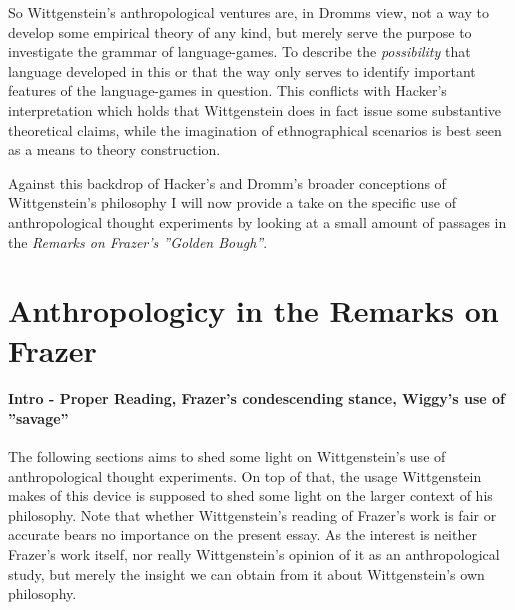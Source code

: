 \documentclass{article}
\begin{document}
So Wittgenstein's anthropological ventures are, in Dromms view, not a way to develop some empirical theory of any kind, but merely serve the purpose to investigate the grammar of language-games. To describe the \textit{possibility} that language developed in this or that the way only serves to identify important features of the language-games in question. This conflicts with Hacker's interpretation which holds that Wittgenstein does in fact issue some substantive theoretical claims, while the imagination of ethnographical scenarios is best seen as a means to theory construction.

Against this backdrop of Hacker's and Dromm's broader conceptions of Wittgenstein's philosophy I will now provide a take on the specific use of anthropological thought experiments by looking at a small amount of passages in the \textit{Remarks on Frazer's ''Golden Bough''}.

\section{Anthropologicy in the Remarks on Frazer}
\paragraph{Intro - Proper Reading, Frazer's condescending stance, Wiggy's use of ''savage''}
The following sections aims to shed some light on Wittgenstein's use of anthropological thought experiments. On top of that, the usage Wittgenstein makes of this device is supposed to shed some light on the larger context of his philosophy. Note that whether Wittgenstein's reading of Frazer's work is fair or accurate bears no importance on the present essay. As the interest is neither Frazer's work itself, nor really Wittgenstein's opinion of it as an anthropological study, but merely the insight we can obtain from it about Wittgenstein's own philosophy. 
\end{document}
